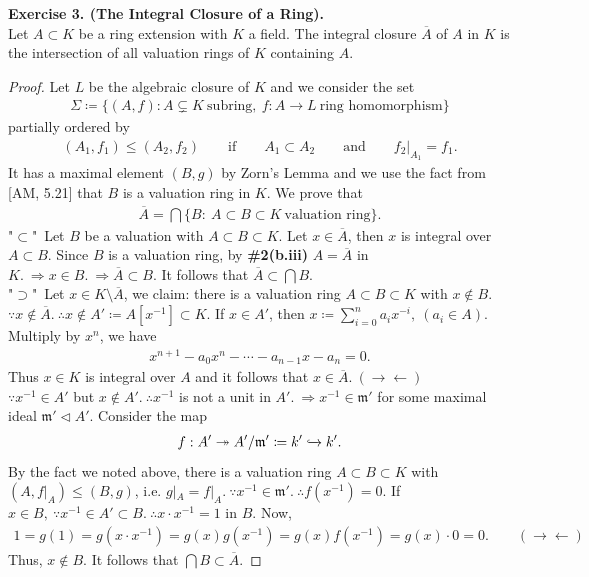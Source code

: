 \documentclass[12pt,a4paper,footinclude=true,headinclude=true]{scrbook} %
\newenvironment{exe}[2][Exercise]
    { \begin{mdframed}[backgroundcolor=gray!20] \textbf{#1 #2.}\\ }
    {  \end{mdframed}}
\begin{document}
\begin{exe}{3. (The Integral Closure of a Ring)}
    Let $A\subset K$ be a ring extension with $K$ a field. The integral closure $\overline{A}$ of $A$ in $K$ is the intersection of all valuation rings of $K$ containing $A$.
\end{exe}
\begin{proof}
    Let $L$ be the algebraic closure of $K$ and we consider the set 
    \begin{align*}
        \Sigma\coloneqq\{(A,f):A\subsetneq K\ \text{subring},\ f:A\to L\ \text{ring homomorphism}\}
    \end{align*}
    partially ordered by
    \begin{align*}
        (A_1,f_1)\leq(A_2,f_2)\qquad\text{if}\qquad A_1\subset A_2\qquad \text{and}\qquad f_2|_{A_1}=f_1.
    \end{align*}
    It has a maximal element $(B,g)$ by Zorn's Lemma and we use the fact from [AM, 5.21] that $B$ is a valuation ring in $K$. We prove that
    \begin{align*}
        \overline{A}=\bigcap\{B:\ A\subset B\subset K\ \text{valuation ring}\}.
    \end{align*}
    "$\subset$"\ Let $B$ be a valuation with $A\subset B\subset K$. Let $x\in\overline{A}$, then $x$ is integral over $A\subset B$. Since $B$ is a valuation ring, by \textbf{\#2(b.iii)} $A=\overline{A}$ in $K.\ \Rightarrow x\in B.\ \Rightarrow \overline{A}\subset B$. It follows that $\overline{A}\subset\bigcap B$.\\
    "$\supset$"\ Let $x\in K\setminus\overline{A}$, we claim: there is a valuation ring $A\subset B\subset K$ with $x\notin B$.\\
    $\because x\notin\overline{A}.\ \therefore x\notin A'\coloneqq A[x^{-1}]\subset K$. If $x\in A'$, then $x\coloneqq\sum_{i=0}^na_ix^{-i},\ (a_i\in A)$. Multiply by $x^n$, we have 
    \begin{align*}
        x^{n+1}-a_0x^n-\cdots-a_{n-1}x-a_n=0.
    \end{align*}
    Thus $x\in K$ is integral over $A$ and it follows that $x\in\overline{A}.\ (\to\gets)$ \\ $\because x^{-1}\in A'$ but $x\notin A'.\ \therefore x^{-1}$ is not a unit in $A'.\ \Rightarrow x^{-1}\in\mathfrak{m}'$ for some maximal ideal $\mathfrak{m}'\triangleleft A'$. Consider the map
    \begin{align*}
        f:A'\twoheadrightarrow A'/\mathfrak{m}'\coloneqq k'\xhookrightarrow{} k'.
    \end{align*}
    By the fact we noted above, there is a valuation ring $A\subset B\subset K$ with $(A,f|_A)\leq(B,g)$, i.e. $g|_A=f|_A.\ \because x^{-1}\in\mathfrak{m}'.\ \therefore f(x^{-1})=0$. If $x\in B,\ \because x^{-1}\in A'\subset B.\ \therefore x\cdot x^{-1}=1$ in $B$. Now, 
    \begin{align*}
        1=g(1)=g(x\cdot x^{-1})=g(x)g(x^{-1})=g(x)f(x^{-1})=g(x)\cdot0=0.\qquad(\to\gets)
    \end{align*}
    Thus, $x\notin B$. It follows that $\bigcap B\subset\overline{A}$.
\end{proof}
\end{document}
